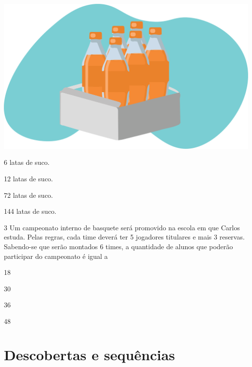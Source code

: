 
\begin{minipage}{.5\textwidth}
\includegraphics[width=\textwidth]{./media/image26.png}
\end{minipage}
\begin{minipage}{.5\textwidth}
\begin{escolha}
\item
  6 latas de suco.
\item
  12 latas de suco.
\item
  72 latas de suco.
\item
  144 latas de suco.
\end{escolha}
\end{minipage}

\num{3} Um campeonato interno de basquete será promovido na escola em que Carlos
estuda. Pelas regras, cada time deverá ter 5 jogadores titulares e mais 3 reservas. Sabendo-se que serão montados 6 times, a quantidade de alunos
que poderão participar do campeonato é igual a

\begin{escolha}
\item
  18
\item
  30
\item
  36
\item
  48
\end{escolha}


\chapter{Descobertas e sequências}
\enlargethispage{\baselineskip}

